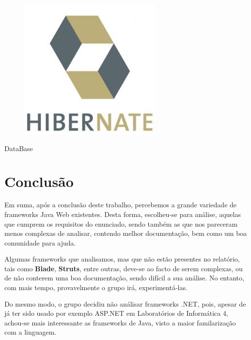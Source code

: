\begin{minipage}{0.5\textwidth}
\begin{figure}[H]
\hfill
\includegraphics[scale=0.25]{images/hibernate.jpg}
\label{fig:chibernate}
\end{figure}
\end{minipage} \hfill
\begin{minipage}{0.45\textwidth}
DataBase
\end{minipage}


\chapter{Conclusão}
\label{sec:conclusao}

\hspace{5mm} Em suma, após a conclusão deste trabalho, percebemos a grande variedade de frameworks Java Web existentes. Desta forma, escolheu-se para análise, aquelas que cumprem os requisitos do enunciado, sendo também as que nos pareceram menos complexas de analisar, contendo melhor documentação, bem como um boa comunidade para ajuda.

\hspace{5mm} Algumas frameworks que analisamos, mas que não estão presentes no relatório, tais como \textbf{Blade}, \textbf{Struts}, entre outras, deve-se ao facto de serem complexas, ou de não conterem uma boa documentação, sendo difícil a sua análise. No entanto, com mais tempo, provavelmente o grupo irá, experimentá-las.

\hspace{5mm}Do mesmo modo, o grupo decidiu não análisar frameworks .NET, pois, apesar de já ter sido usado por exemplo ASP.NET em Laboratórios de Informática 4, achou-se mais interessante as frameworks de Java, visto a maior familarização com a linguagem.
